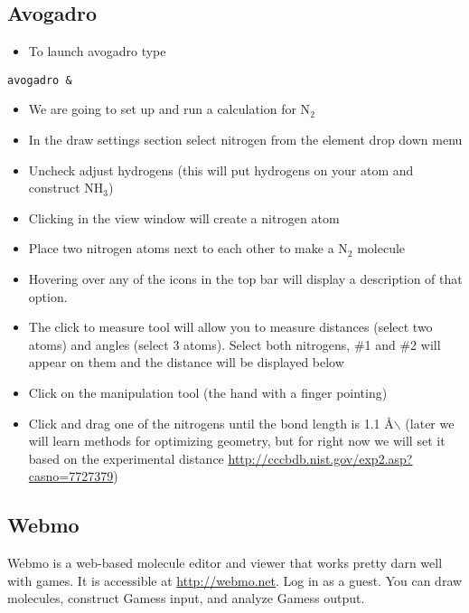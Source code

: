 \documentclass[11pt]{article}
\begin{document}
\subsection{Avogadro}
\label{sec:org33afa39}

\begin{itemize}
\item To launch avogadro type
\end{itemize}

\begin{verbatim}
avogadro &
\end{verbatim}

\begin{itemize}
\item We are going to set up and run a calculation for N\(_{\text{2}}\)

\item In the draw settings section select nitrogen from the element drop down menu

\item Uncheck adjust hydrogens (this will put hydrogens on your atom and construct NH\(_{\text{3}}\))

\item Clicking in the view window will create a nitrogen atom

\item Place two nitrogen atoms next to each other to make a N\(_{\text{2}}\) molecule

\item Hovering over any of the icons in the top bar will display a description of that option.

\item The click to measure tool will allow you to measure distances (select two atoms) and angles (select 3 atoms). Select both nitrogens, \#1 and \#2 will appear on them and the distance will be displayed below

\item Click on the manipulation tool (the hand with a finger pointing)

\item Click and drag one of the nitrogens until the bond length is 1.1 \AA{}$\backslash$ (later we will learn methods for optimizing geometry, but for right now we will set it based on the experimental distance \url{http://cccbdb.nist.gov/exp2.asp?casno=7727379})
\end{itemize}

\subsection{Webmo}
\label{sec:orgeb23c90}
Webmo is a web-based molecule editor and viewer that works pretty darn well with games.  It is accessible at \url{http://webmo.net}.  Log in as a guest.  You can draw molecules, construct Gamess input, and analyze Gamess output.
\end{document}
